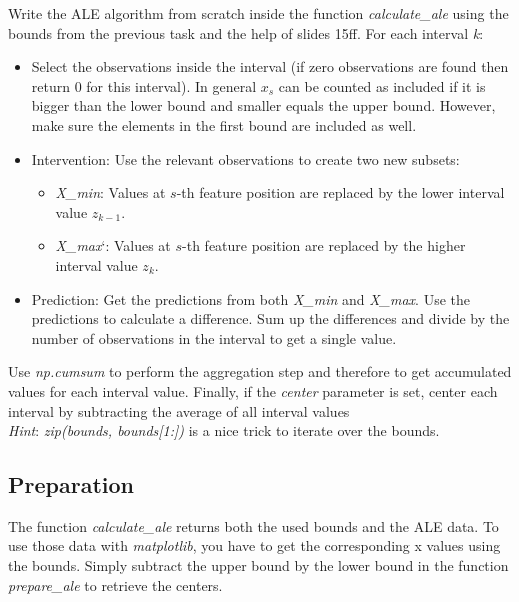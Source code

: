 \documentclass[a4paper]{article}
\begin{document}
Write the ALE algorithm from scratch inside the function \textit{calculate\_ale} using the bounds from the previous task and the help of slides 15ff. For each interval \textit{k}:
\begin{itemize}
    \item Select the observations inside the interval (if zero observations are found then return 0 for this interval). In general $x_s$ can be counted as included if it is bigger than the lower bound and smaller equals the upper bound. However, make sure the elements in the first bound are included as well.
    \item Intervention: Use the relevant observations to create two new subsets:
    
    \begin{itemize}
        \item \textit{X\_min}: Values at $s$-th feature position are replaced by the lower interval value $z_{k-1}$.
        \item \textit{X\_max}`: Values at $s$-th feature position are replaced by the higher interval value $z_k$.
    \end{itemize}

    \item Prediction: Get the predictions from both \textit{X\_min} and \textit{X\_max}. Use the predictions to calculate a
      difference. Sum up the differences and divide by the number of observations in the interval to get a single value.
    
\end{itemize}

\noindent Use \textit{np.cumsum} to perform the aggregation step and therefore to get accumulated values for each interval value. Finally, if the \textit{center} parameter is set, center each interval by subtracting the average of all interval values\\

\noindent \textit{Hint}: \textit{zip(bounds, bounds[1:])} is a nice trick to iterate over the bounds.


\subsection{Preparation}

The function \textit{calculate\_ale} returns both the used bounds and the ALE data. To use those data with \textit{matplotlib}, you have to get the corresponding x values using the bounds. Simply subtract the upper bound by the lower bound in the function \textit{prepare\_ale} to retrieve the centers.
\end{document}
